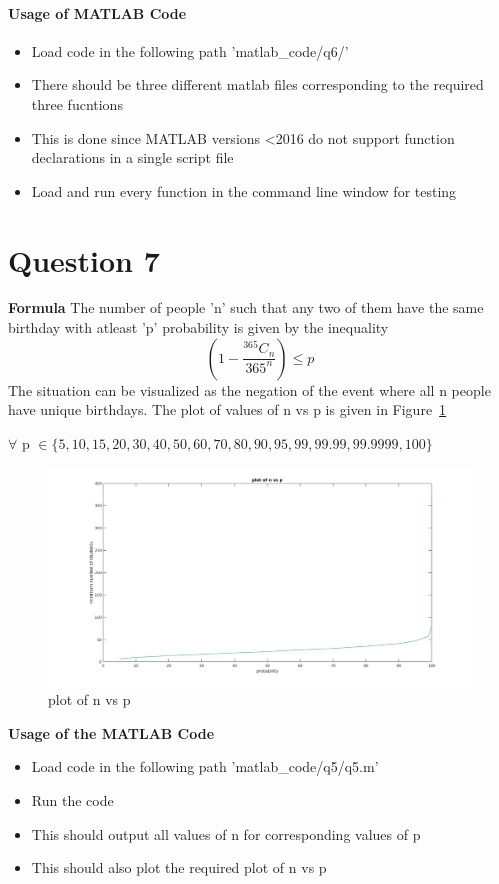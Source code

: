 \documentclass[12pt]{article}
\begin{document}
\paragraph{Usage of MATLAB Code}
\begin{itemize}
\item Load code in the following path 'matlab\_code/q6/'
\item There should be three different matlab files corresponding to the required three fucntions
\item This is done since MATLAB versions <2016 do not support function declarations in a single script file
\item Load and run every function in the command line window for testing
\end{itemize}


\newpage
\section{Question 7}
\textbf{Formula}
\newline
The number of people 'n' such that any two of them have the same birthday with atleast 'p' probability is given by the inequality
$$\left(1-\frac{^{365}C_n}{365^n}\right) \leq p$$
The situation can be visualized as the negation of the event where all n people have unique birthdays.
\newline
The plot of values of n vs p is given in Figure~\ref{fig:7.1}
\begin{flushright}
$\forall$ p $\in \{5, 10, 15, 20, 30, 40, 50, 60, 70, 80, 90, 95, 99, 99.99, 99.9999, 100\}$
\end{flushright}
\begin{figure} [h!]
\includegraphics[width=\linewidth]{plot.jpg}
\caption{plot of n vs p}
\label{fig:7.1}
\end{figure}
\textbf{Usage of the MATLAB Code}
\begin{itemize}
\item Load code in the following path 'matlab\_code/q5/q5.m'
\item Run the code
\item This should output all values of n for corresponding values of p
\item This should also plot the required plot of n vs p
\end{itemize}
\end{document}
